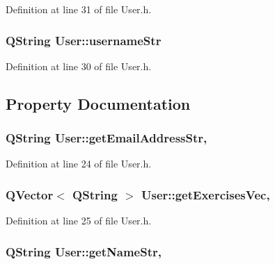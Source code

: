 Definition at line 31 of file User.\-h.

\hypertarget{class_user_aa05f77ad89b778912aa5c0d87ddf532a}{
\subsubsection[{username\-Str}]{\setlength{\rightskip}{0pt plus 5cm}Q\-String User\-::username\-Str\hspace{0.3cm}{\ttfamily [private]}}}\label{class_user_aa05f77ad89b778912aa5c0d87ddf532a}


Definition at line 30 of file User.\-h.



\subsection{Property Documentation}
\hypertarget{class_user_af4a625ca8127b47eb2682d68d0c28004}{
\subsubsection[{get\-Email\-Address\-Str}]{\setlength{\rightskip}{0pt plus 5cm}Q\-String User\-::get\-Email\-Address\-Str\hspace{0.3cm}{\ttfamily [read]}, {\ttfamily [write]}}}\label{class_user_af4a625ca8127b47eb2682d68d0c28004}


Definition at line 24 of file User.\-h.

\hypertarget{class_user_a2035ad99a92537a04aa8025e536096d4}{
\subsubsection[{get\-Exercises\-Vec}]{\setlength{\rightskip}{0pt plus 5cm}Q\-Vector$<$ Q\-String $>$ User\-::get\-Exercises\-Vec\hspace{0.3cm}{\ttfamily [read]}, {\ttfamily [write]}}}\label{class_user_a2035ad99a92537a04aa8025e536096d4}


Definition at line 25 of file User.\-h.

\hypertarget{class_user_aff5d8481b6710290eb9782a3eea47a29}{
\subsubsection[{get\-Name\-Str}]{\setlength{\rightskip}{0pt plus 5cm}Q\-String User\-::get\-Name\-Str\hspace{0.3cm}{\ttfamily [read]}, {\ttfamily [write]}}}\label{class_user_aff5d8481b6710290eb9782a3eea47a29}


